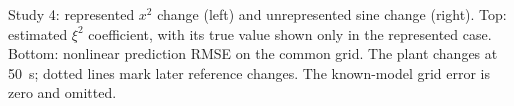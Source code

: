 \caption{Study 4: represented $x^2$ change (left) and unrepresented sine
change (right). Top: estimated $\xi^2$ coefficient, with its true value
shown only in the represented case. Bottom: nonlinear prediction RMSE
on the common grid. The plant changes at 50~s; dotted lines mark later
reference changes. The known-model grid error is zero and omitted.}
